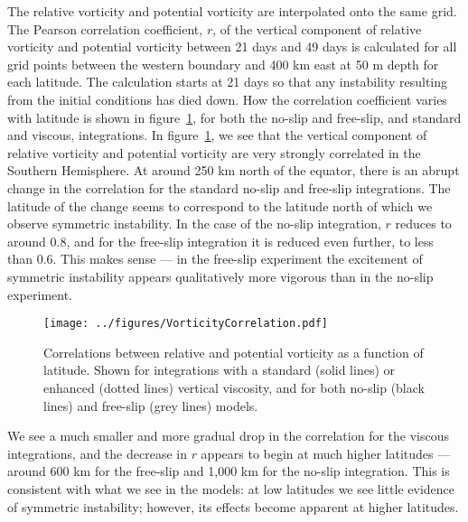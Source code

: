 The relative vorticity and potential vorticity are interpolated onto the same grid. The Pearson correlation coefficient, $r$, of the vertical component of relative vorticity and potential vorticity between 21 days and 49 days is calculated for all grid points between the western boundary and 400 km east at 50 m depth for each latitude. The calculation starts at 21 days so that any instability resulting from the initial conditions has died down. How the correlation coefficient varies with latitude is shown in figure~\ref{fig:VorticityCorrelations}, for both the no-slip and free-slip, and standard and viscous, integrations.
In figure~\ref{fig:VorticityCorrelations}, we see that the vertical component of relative vorticity and potential vorticity are very strongly correlated in the Southern Hemisphere. At around 250 km north of the equator, there is an abrupt change in the correlation for the standard no-slip and free-slip integrations. The latitude of the change seems to correspond to the latitude north of which we observe symmetric instability. In the case of the no-slip integration, $r$ reduces to around 0.8, and for the free-slip integration it is reduced even further, to less than 0.6. This makes sense --- in the free-slip experiment the excitement of symmetric instability appears qualitatively more vigorous than in the no-slip experiment.

\begin{figure} 
    \centering
    \texttt{[image: ../figures/VorticityCorrelation.pdf]}
    \caption{Correlations between relative and potential vorticity as a function of latitude. Shown for integrations with a standard (solid lines) or enhanced (dotted lines) vertical viscosity, and for both no-slip (black lines) and free-slip (grey lines) models.}
    \label{fig:VorticityCorrelations}
\end{figure}

We see a much smaller and more gradual drop in the correlation for the viscous integrations, and the decrease in $r$ appears to begin at much higher latitudes --- around 600 km for the free-slip and 1,000 km for the no-slip integration. This is consistent with what we see in the models: at low latitudes we see little evidence of symmetric instability; however, its effects become apparent at higher latitudes.

